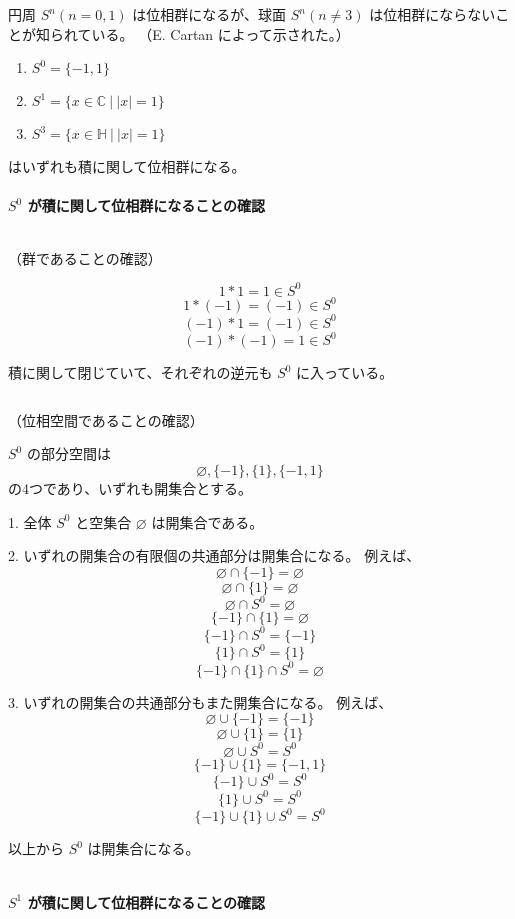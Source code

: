 \documentclass[uplatex,a4j,12pt,dvipdfmx]{jsarticle}
\begin{document}
円周 $S^{n} (n=0,1)$ は位相群になるが、球面 $S^{n} (n \neq 3)$ は位相群にならないことが知られている。
（E. Cartan によって示された。）

\begin{enumerate}
	\item $S^{0} = \{ -1, 1 \}$
	\item $S^{1} = \{ x \in \mathbb{C} \ | \ |x| = 1 \}$
	\item $S^{3} = \{ x \in \mathbb{H} \ | \ |x| = 1 \}$
\end{enumerate}

はいずれも積に関して位相群になる。


\paragraph{$S^{0}$ が積に関して位相群になることの確認}

${}$

（群であることの確認）

$$1*1=1 \in S^{0}$$
$$1*(-1)=(-1) \in S^{0}$$
$$(-1)*1=(-1) \in S^{0}$$
$$(-1)*(-1)=1 \in S^{0}$$

積に関して閉じていて、それぞれの逆元も $S^{0}$ に入っている。

${}$

（位相空間であることの確認）

$S^{0}$ の部分空間は
$$\varnothing, \{ -1 \} , \{ 1 \} , \{ -1 , 1 \}$$
の4つであり、いずれも開集合とする。

1. 全体 $S^{0}$ と空集合 $\varnothing$ は開集合である。

2. いずれの開集合の有限個の共通部分は開集合になる。
例えば、
$$\varnothing \cap \{ -1 \} = \varnothing$$
$$\varnothing \cap \{ 1 \} = \varnothing$$
$$\varnothing \cap S^{0} = \varnothing$$
$$ \{ -1 \} \cap \{ 1 \} = \varnothing$$
$$ \{ -1 \} \cap S^{0} = \{ -1 \} $$
$$ \{ 1 \} \cap S^{0} = \{ 1 \} $$
$$ \{ -1 \} \cap \{ 1 \} \cap S^{0} = \varnothing $$

3. いずれの開集合の共通部分もまた開集合になる。
例えば、
$$\varnothing \cup \{ -1 \} = \{ -1 \}$$
$$\varnothing \cup \{ 1 \} = \{ 1 \}$$
$$\varnothing \cup S^{0} = S^{0}$$
$$ \{ -1 \} \cup \{ 1 \} = \{ -1 , 1 \}$$
$$ \{ -1 \} \cup S^{0} = S^{0} $$
$$ \{ 1 \} \cup S^{0} = S^{0} $$
$$ \{ -1 \} \cup \{ 1 \} \cup S^{0} = S^{0} $$

以上から $S^{0}$ は開集合になる。

${}$

\paragraph{$S^{1}$ が積に関して位相群になることの確認}
\end{document}
